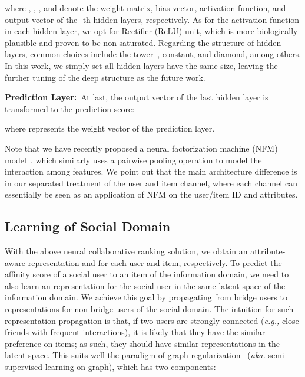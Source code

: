 \documentclass[sigconf]{acmart}
\newcommand{\eg}{\emph{e.g., }}
\newcommand{\aka}{\emph{aka. }}
\begin{document}
where , , , and  denote the weight matrix, bias vector, activation function, and output vector of the -th hidden layers, respectively. As for the activation function in each hidden layer, we opt for Rectifier (ReLU) unit, which is more biologically plausible and proven to be non-saturated.
Regarding the structure of hidden layers, common choices include the tower~\cite{heneural,DBLP:conf/recsys/CovingtonAS16}, constant, and diamond, among others. In this work, we simply set all hidden layers have the same size, leaving the further tuning of the deep structure as the future work.

\textbf{Prediction Layer:}~At last, the output vector of the last hidden layer  is transformed to the prediction score:

where  represents the weight vector of the prediction layer.

Note that we have recently proposed a neural factorization machine (NFM) model~\cite{he2017neural}, which similarly uses a pairwise pooling operation to model the interaction among features. We point out that the main architecture difference is in our separated treatment of the user and item channel, where each channel can essentially be seen as an application of NFM on the user/item ID and attributes.

















\subsection{Learning of Social Domain}

With the above neural collaborative ranking solution, we obtain an attribute-aware representation  and  for each user and item, respectively.
To predict the affinity score of a social user to an item of the information domain, we need to also learn an representation for the social user in the same latent space of the information domain. We achieve this goal by propagating  from bridge users to representations for non-bridge users of the social domain. The intuition for such representation propagation is that, if two users are strongly connected (\eg close friends with frequent interactions), it is likely that they have the similar preference on items; as such, they should have similar representations in the latent space. This suits well the paradigm of graph regularization~\cite{DBLP:conf/cikm/HeCKC15,DBLP:journals/tkde/WangFHLW17,DBLP:journals/tkde/WangFHTW16,fuli2017computational} (\aka semi-supervised learning on graph), which has two components:
\end{document}
